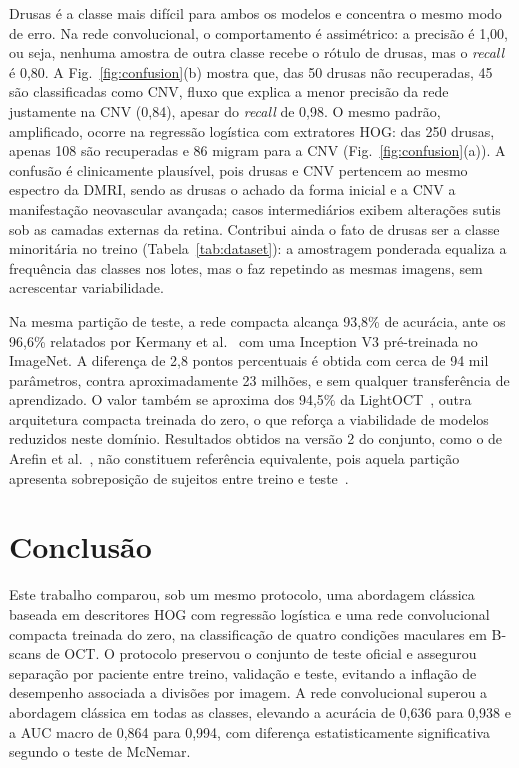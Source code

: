 \documentclass[conference]{IEEEtran}
\begin{document}
Drusas é a classe mais difícil para ambos os modelos e concentra o mesmo modo de erro. Na rede convolucional, o comportamento é assimétrico: a precisão é 1,00, ou seja, nenhuma amostra de outra classe recebe o rótulo de drusas, mas o \textit{recall} é 0,80. A Fig.~\ref{fig:confusion}(b) mostra que, das 50 drusas não recuperadas, 45 são classificadas como CNV, fluxo que explica a menor precisão da rede justamente na CNV (0,84), apesar do \textit{recall} de 0,98. O mesmo padrão, amplificado, ocorre na regressão logística com extratores HOG: das 250 drusas, apenas 108 são recuperadas e 86 migram para a CNV (Fig.~\ref{fig:confusion}(a)). A confusão é clinicamente plausível, pois drusas e CNV pertencem ao mesmo espectro da DMRI, sendo as drusas o achado da forma inicial e a CNV a manifestação neovascular avançada; casos intermediários exibem alterações sutis sob as camadas externas da retina. Contribui ainda o fato de drusas ser a classe minoritária no treino (Tabela~\ref{tab:dataset}): a amostragem ponderada equaliza a frequência das classes nos lotes, mas o faz repetindo as mesmas imagens, sem acrescentar variabilidade.

Na mesma partição de teste, a rede compacta alcança 93,8\% de acurácia, ante os 96,6\% relatados por Kermany et al.~\cite{kermany2018} com uma Inception V3 pré-treinada no ImageNet. A diferença de 2,8 pontos percentuais é obtida com cerca de 94 mil parâmetros, contra aproximadamente 23 milhões, e sem qualquer transferência de aprendizado. O valor também se aproxima dos 94,5\% da LightOCT~\cite{butola2020}, outra arquitetura compacta treinada do zero, o que reforça a viabilidade de modelos reduzidos neste domínio. Resultados obtidos na versão 2 do conjunto, como o de Arefin et al.~\cite{arefin2021}, não constituem referência equivalente, pois aquela partição apresenta sobreposição de sujeitos entre treino e teste~\cite{tampu2022}.

\section{Conclusão}
\label{sec:conclusao}

Este trabalho comparou, sob um mesmo protocolo, uma abordagem clássica baseada em descritores HOG com regressão logística e uma rede convolucional compacta treinada do zero, na classificação de quatro condições maculares em B-scans de OCT. O protocolo preservou o conjunto de teste oficial e assegurou separação por paciente entre treino, validação e teste, evitando a inflação de desempenho associada a divisões por imagem. A rede convolucional superou a abordagem clássica em todas as classes, elevando a acurácia de 0,636 para 0,938 e a AUC macro de 0,864 para 0,994, com diferença estatisticamente significativa segundo o teste de McNemar.
\end{document}
